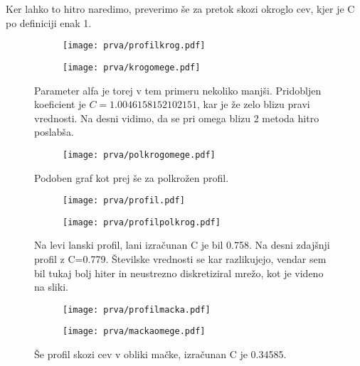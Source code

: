 \documentclass{article}
\begin{document}
Ker lahko to hitro naredimo, preverimo še za pretok skozi okroglo cev, kjer je C po definiciji enak 1.

\begin{figure}[H]
\centering
\begin{subfigure}{.49\textwidth}
\texttt{[image: prva/profilkrog.pdf]}
\end{subfigure}
\begin{subfigure}{.49\textwidth}
\texttt{[image: prva/krogomege.pdf]}
\end{subfigure}
\caption*{Parameter alfa je torej v tem primeru nekoliko manjši. Pridobljen koeficient je $C=1.0046158152102151$, kar je že zelo blizu pravi vrednosti. Na desni vidimo, da se pri omega blizu 2 metoda hitro poslabša.}
\end{figure}


\begin{figure}[H]
\centering
\begin{subfigure}{.49\textwidth}
\texttt{[image: prva/polkrogomege.pdf]}
\end{subfigure}
\caption*{Podoben graf kot prej še za polkrožen profil.}
\end{figure}


\begin{figure}[H]
\centering
\begin{subfigure}{.49\textwidth}
\texttt{[image: prva/profil.pdf]}
\end{subfigure}
\begin{subfigure}{.49\textwidth}
\texttt{[image: prva/profilpolkrog.pdf]}
\end{subfigure}
\caption*{Na levi lanski profil, lani izračunan C je bil 0.758. Na desni zdajšnji profil z C=0.779. Številske vrednosti se kar razlikujejo, vendar sem bil tukaj bolj hiter in neustrezno diskretiziral mrežo, kot je videno na sliki.}
\end{figure}

\begin{figure}[H]
\centering
\begin{subfigure}{.49\textwidth}
\texttt{[image: prva/profilmacka.pdf]}
\end{subfigure}
\begin{subfigure}{.49\textwidth}
\texttt{[image: prva/mackaomege.pdf]}
\end{subfigure}
\caption*{Še profil skozi cev v obliki mačke, izračunan C je 0.34585.}
\end{figure}
\newpage
\end{document}
